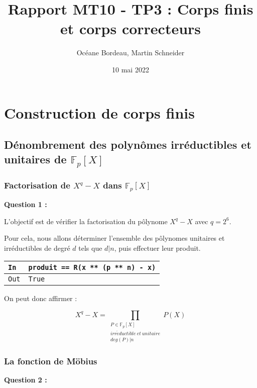\documentclass[titlepage]{article}
\title{Rapport MT10 - TP3 : Corps finis et corps correcteurs}
\author{Océane Bordeau, Martin Schneider}
\date{10 mai 2022}
\begin{document}
    \maketitle
    \tableofcontents
    \pagebreak

    \section{Construction de corps finis}
        \setcounter{subsection}{2}
        \subsection{Dénombrement des polynômes irréductibles et unitaires de $\mathbb{F}_p[X]$}
            \subsubsection{Factorisation de $X^q-X$ dans $\mathbb{F}_p[X]$}
            \textbf{Question 1 :}

            L'objectif est de vérifier la factorisation du pôlynome $X^q-X$ avec $q=2^6$.

            Pour cela, nous allons déterminer l'ensemble des pôlynomes unitaires et 
            irréductibles de degré $d$ tels que $d|n$, puis effectuer leur produit.

            

            \begin{tabularx}{12cm}{|p{0.60cm}|X|}
                \hline
                \rowcolor{gray}
                \texttt{In}
                & 
                \texttt{produit == R(x ** (p ** n) - x)}
                \\
                \hline
                \texttt{Out}
                &
                \texttt{True}
                \\
                \hline
            \end{tabularx}
            \bigbreak

            On peut donc affirmer :

            \[ X^q-X=\prod_{\substack{P \in \mathbb{F}_p[X] \\ irr\acute{e}ductible \: et \: unitaire  \\ deg(P)|n}} P(X) \]

            \subsubsection{La fonction de Möbius}
            \textbf{Question 2 :}
\end{document}
